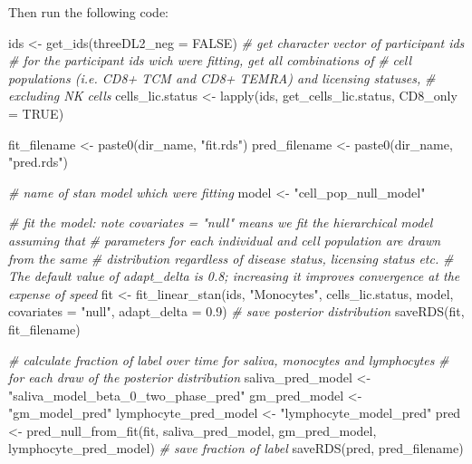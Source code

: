 \documentclass[
]{article}
\newenvironment{Shaded}{\begin{snugshade}}{\end{snugshade}}
\newcommand{\AttributeTok}[1]{\textcolor[rgb]{0.77,0.63,0.00}{#1}}
\newcommand{\CommentTok}[1]{\textcolor[rgb]{0.56,0.35,0.01}{\textit{#1}}}
\newcommand{\ConstantTok}[1]{\textcolor[rgb]{0.00,0.00,0.00}{#1}}
\newcommand{\FloatTok}[1]{\textcolor[rgb]{0.00,0.00,0.81}{#1}}
\newcommand{\FunctionTok}[1]{\textcolor[rgb]{0.00,0.00,0.00}{#1}}
\newcommand{\NormalTok}[1]{#1}
\newcommand{\OtherTok}[1]{\textcolor[rgb]{0.56,0.35,0.01}{#1}}
\newcommand{\StringTok}[1]{\textcolor[rgb]{0.31,0.60,0.02}{#1}}
\begin{document}
Then run the following code:

\begin{Shaded}
\begin{Highlighting}[]
\NormalTok{ids }\OtherTok{\textless{}{-}} \FunctionTok{get\_ids}\NormalTok{(}\AttributeTok{threeDL2\_neg =} \ConstantTok{FALSE}\NormalTok{) }\CommentTok{\# get character vector of participant ids}
\CommentTok{\# for the participant ids wich we\textquotesingle{}re fitting, get all combinations of}
\CommentTok{\# cell populations (i.e. CD8+ TCM and CD8+ TEMRA) and licensing statuses,}
\CommentTok{\# excluding NK cells}
\NormalTok{cells\_lic.status }\OtherTok{\textless{}{-}} \FunctionTok{lapply}\NormalTok{(ids, get\_cells\_lic.status, }\AttributeTok{CD8\_only =} \ConstantTok{TRUE}\NormalTok{)}

\NormalTok{fit\_filename }\OtherTok{\textless{}{-}} \FunctionTok{paste0}\NormalTok{(dir\_name, }\StringTok{"fit.rds"}\NormalTok{)}
\NormalTok{pred\_filename }\OtherTok{\textless{}{-}} \FunctionTok{paste0}\NormalTok{(dir\_name, }\StringTok{"pred.rds"}\NormalTok{)}


\CommentTok{\# name of stan model which we\textquotesingle{}re fitting}
\NormalTok{model }\OtherTok{\textless{}{-}} \StringTok{"cell\_pop\_null\_model"}
\end{Highlighting}
\end{Shaded}

\begin{Shaded}
\begin{Highlighting}[]
\CommentTok{\# fit the model: note covariates = "null" means we fit the hierarchical model assuming that}
\CommentTok{\# parameters for each individual and cell population are drawn from the same}
\CommentTok{\# distribution regardless of disease status, licensing status etc.}
\CommentTok{\# The default value of adapt\_delta is 0.8; increasing it improves convergence at the expense of speed}
\NormalTok{fit }\OtherTok{\textless{}{-}} \FunctionTok{fit\_linear\_stan}\NormalTok{(ids, }\StringTok{"Monocytes"}\NormalTok{, cells\_lic.status, model, }\AttributeTok{covariates =} \StringTok{"null"}\NormalTok{, }\AttributeTok{adapt\_delta =} \FloatTok{0.9}\NormalTok{)}
\CommentTok{\# save posterior distribution}
\FunctionTok{saveRDS}\NormalTok{(fit, fit\_filename)}

\CommentTok{\# calculate fraction of label over time for saliva, monocytes and lymphocytes}
\CommentTok{\# for each draw of the posterior distribution}
\NormalTok{saliva\_pred\_model }\OtherTok{\textless{}{-}} \StringTok{"saliva\_model\_beta\_0\_two\_phase\_pred"}
\NormalTok{gm\_pred\_model }\OtherTok{\textless{}{-}} \StringTok{"gm\_model\_pred"}
\NormalTok{lymphocyte\_pred\_model }\OtherTok{\textless{}{-}} \StringTok{"lymphocyte\_model\_pred"}
\NormalTok{pred }\OtherTok{\textless{}{-}} \FunctionTok{pred\_null\_from\_fit}\NormalTok{(fit, saliva\_pred\_model, gm\_pred\_model, lymphocyte\_pred\_model)}
\CommentTok{\# save fraction of label}
\FunctionTok{saveRDS}\NormalTok{(pred, pred\_filename)}
\end{Highlighting}
\end{Shaded}
\end{document}
